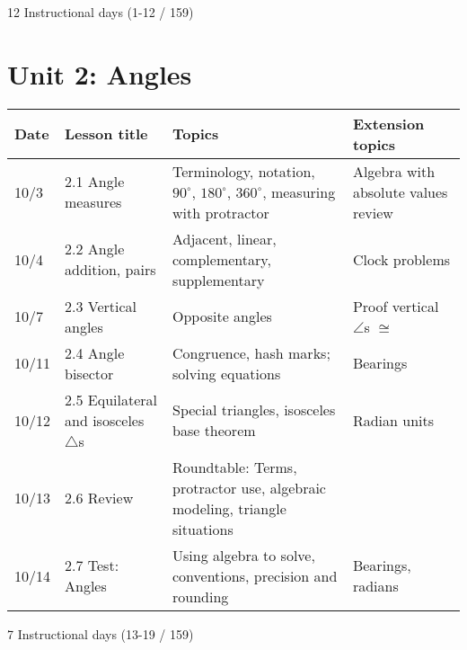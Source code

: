 12 Instructional days (1-12 / 159)

\newpage
\section*{Unit 2: Angles}
\begin{tabular}{|p{0.9cm}|p{4cm}|p{7cm}|p{5cm}|}
  \hline
  Date & Lesson title & Topics  & Extension topics \\
  \hline
  10/3 & 2.1 Angle measures & Terminology, notation, $90^\circ$, $180^\circ$, $360^\circ$, measuring with protractor & Algebra with absolute values review \\
  \hline
  10/4 & 2.2 Angle addition, pairs & Adjacent, linear, complementary, supplementary & Clock problems \\
  \hline
  10/7 & 2.3 Vertical angles & Opposite angles & Proof vertical $\angle$s $\cong$ \\
  \hline
  10/11 & 2.4 Angle bisector & Congruence, hash marks; solving equations & Bearings \\
  \hline
  10/12 & 2.5 Equilateral and isosceles $\triangle$s & Special triangles, isosceles base theorem & Radian units \\
  \hline
  10/13 & 2.6 Review & Roundtable: Terms, protractor use, algebraic modeling, triangle situations & \\
  \hline
  10/14 & 2.7 Test: Angles & Using algebra to solve, conventions, precision and rounding & Bearings, radians \\
  \hline

\end{tabular} \par \vspace*{0.3cm}
7 Instructional days (13-19 / 159)

